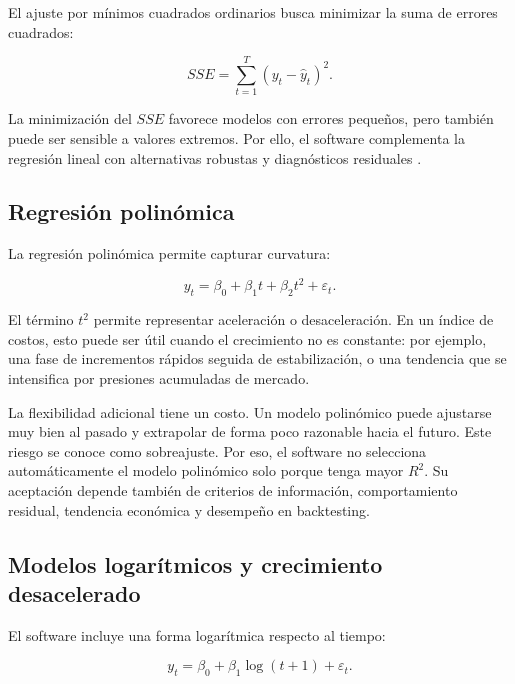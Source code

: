 El ajuste por mínimos cuadrados ordinarios busca minimizar la suma de errores cuadrados:

\begin{equation}
    SSE = \sum_{t=1}^{T} (y_t - \hat{y}_t)^2.
    \label{eq:sse}
\end{equation}

La minimización del \(SSE\) favorece modelos con errores pequeños, pero también puede ser sensible a valores extremos. Por ello, el software complementa la regresión lineal con alternativas robustas y diagnósticos residuales \parencite{penn_state_robust_regression}.

\subsection{Regresión polinómica}

La regresión polinómica permite capturar curvatura:

\begin{equation}
    y_t = \beta_0 + \beta_1 t + \beta_2 t^2 + \varepsilon_t.
    \label{eq:regresion_polinomica}
\end{equation}

El término \(t^2\) permite representar aceleración o desaceleración. En un índice de costos, esto puede ser útil cuando el crecimiento no es constante: por ejemplo, una fase de incrementos rápidos seguida de estabilización, o una tendencia que se intensifica por presiones acumuladas de mercado.

La flexibilidad adicional tiene un costo. Un modelo polinómico puede ajustarse muy bien al pasado y extrapolar de forma poco razonable hacia el futuro. Este riesgo se conoce como sobreajuste. Por eso, el software no selecciona automáticamente el modelo polinómico solo porque tenga mayor \(R^2\). Su aceptación depende también de criterios de información, comportamiento residual, tendencia económica y desempeño en backtesting.

\subsection{Modelos logarítmicos y crecimiento desacelerado}

El software incluye una forma logarítmica respecto al tiempo:

\begin{equation}
    y_t = \beta_0 + \beta_1 \log(t + 1) + \varepsilon_t.
    \label{eq:modelo_logaritmico}
\end{equation}

